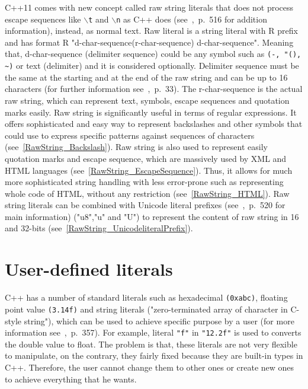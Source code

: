 \documentclass[11pt]{report}
\begin{document}
C++11 comes with new concept called raw string literals that does not process escape sequences like \texttt{$\backslash$t} and \texttt{$\backslash$n} as C++ does (see~\cite{Stroustrup:2012:Cpp11},~p.~516 for addition information), instead, as normal text. Raw literal is a string literal with R prefix and has format R "d-char-sequence(r-char-sequence) d-char-sequence". Meaning that, d-char-sequence (delimiter sequence) could be any symbol such as \texttt{(-, "(), \~{})} or text (delimiter) and it is considered optionally. Delimiter sequence must be the same at the starting and at the end of the raw string and can be up to 16 characters (for further information see~\cite{ISO:2011:Cpplanguage},~p.~33). The r-char-sequence is the actual raw string, which can represent text, symbols, escape sequences and quotation marks easily. Raw string is significantly useful in terms of regular expressions. It offers sophisticated and easy way to represent backslashes and other symbols that could use to express specific patterns against sequences of characters (see~\ref{RawString_Backslash}). Raw string is also used to represent easily quotation marks and escape sequence, which are massively used by XML and HTML languages (see~\ref{RawString_EscapeSequence}). Thus, it allows for much more sophisticated string handling with less error-prone such as representing whole code of HTML, without any restriction (see~\ref{RawString_HTML}). Raw string literals can be combined with Unicode literal prefixes (see~\cite{Gregorie:professionalcpp},~p.~520 for main information) ("u8","u" and "U") to represent the content of raw string in 16 and 32-bits (see~\ref{RawString_UnicodeliteralPrefix}).

\section{User-defined literals}
\label{section: User-defined literals}
C++ has a number of standard literals such as hexadecimal \texttt{(0xabc)}, floating point value \texttt{(3.14f)} and string literals ("zero-terminated array of character in C-style string"), which can be used to achieve specific purpose by a user (for more information see~\cite{Overland:2011:CWF},~p.~357). For example, literal \texttt{"f"} in \texttt{"12.2f"} is used to converts the double value to float. The problem is that, these literals are not very flexible to manipulate, on the contrary, they fairly fixed because they are built-in types in C++. Therefore, the user cannot change them to other ones or create new ones to achieve everything that he wants.
\end{document}
